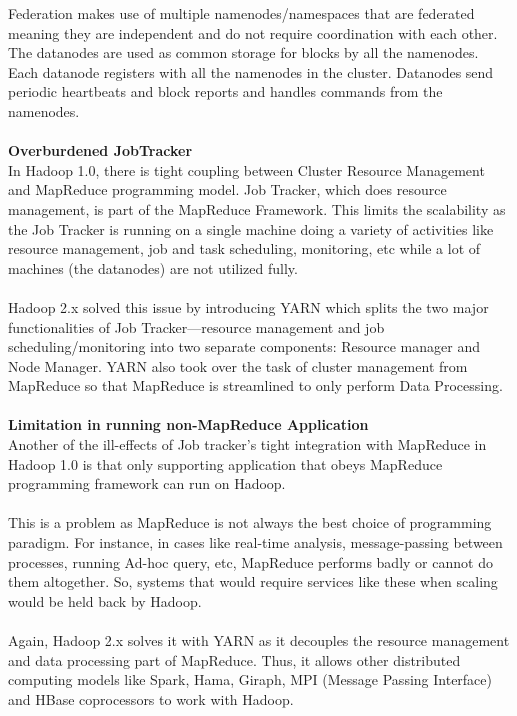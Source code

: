 \documentclass[a4paper,12pt,oneside]{report}
\begin{document}
Federation makes use of multiple namenodes/namespaces that are federated meaning they are independent and do not 
require coordination with each other. The datanodes are used as common storage for blocks by all the namenodes. 
Each datanode registers with all the namenodes in the cluster. Datanodes send periodic heartbeats and block reports 
and handles commands from the namenodes.\cite{Suresh2011}\\
\\
\textbf{Overburdened JobTracker}\\
In Hadoop 1.0, there is tight coupling between Cluster Resource Management and MapReduce programming model. 
Job Tracker, which does resource management, is part of the MapReduce Framework. 
This limits the scalability as the Job Tracker is running on a single machine doing a variety of activities like 
resource management, job and task scheduling, monitoring, etc while a lot of machines (the datanodes) are not utilized fully.\\
\\
Hadoop 2.x solved this issue by introducing YARN which splits the two major functionalities of Job Tracker—resource 
management and job scheduling/monitoring into two separate components: Resource manager and Node Manager. 
YARN also took over the task of cluster management from MapReduce so that MapReduce is streamlined to only perform Data Processing.\\
\\
\textbf{Limitation in running non-MapReduce Application}\\
Another of the ill-effects of Job tracker’s tight integration with MapReduce in Hadoop 1.0 is that only supporting application 
that obeys MapReduce programming framework can run on Hadoop.\\ 
\\
This is a problem as MapReduce is not always the best choice of programming paradigm. 
For instance, in cases like real-time analysis, message-passing between processes, running Ad-hoc query, etc, 
MapReduce performs badly or cannot do them altogether. So, systems that would require services like these when scaling 
would be held back by Hadoop.\\ 
\\
Again, Hadoop 2.x solves it with YARN as it decouples the resource management and data processing part of MapReduce. 
Thus, it allows other distributed computing models like Spark, Hama, Giraph, MPI (Message Passing Interface) and HBase 
coprocessors to work with Hadoop. 
\end{document}
